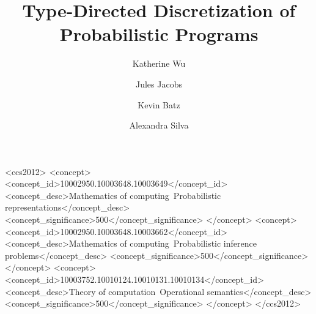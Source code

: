 \documentclass[acmsmall]{acmart}
\theoremstyle{remark}
\theoremstyle{acmplain}
\begin{document}
\title{Type-Directed Discretization of Probabilistic Programs}

\author{Katherine Wu}

\author{Jules Jacobs}

\author{Kevin Batz}

\author{Alexandra Silva}




\begin{CCSXML}
<ccs2012>
   <concept>
       <concept_id>10002950.10003648.10003649</concept_id>
       <concept_desc>Mathematics of computing~Probabilistic representations</concept_desc>
       <concept_significance>500</concept_significance>
       </concept>
   <concept>
       <concept_id>10002950.10003648.10003662</concept_id>
       <concept_desc>Mathematics of computing~Probabilistic inference problems</concept_desc>
       <concept_significance>500</concept_significance>
       </concept>
   <concept>
       <concept_id>10003752.10010124.10010131.10010134</concept_id>
       <concept_desc>Theory of computation~Operational semantics</concept_desc>
       <concept_significance>500</concept_significance>
       </concept>
 </ccs2012>
\end{CCSXML}




\end{document}
